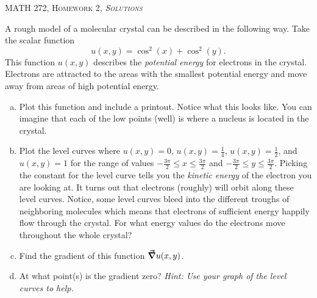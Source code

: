 \documentclass[12pt]{article} %
\begin{document}
\begin{center}
   \textsc{\large MATH 272, Homework 2, \emph{Solutions}}\\
\end{center}
\vspace{.5cm}

\begin{problem}
A rough model of a molecular crystal can be described in the following way. Take the scalar function
\[
u(x,y)=\cos^2(x)+\cos^2(y).
\]
This function $u(x,y)$ describes the \emph{potential energy} for electrons in the crystal. Electrons are attracted to the areas with the smallest potential energy and move away from areas of high potential energy. 
\begin{enumerate}[(a)]
    \item Plot this function and include a printout.  Notice what this looks like.  You can imagine that each of the low points (well) is where a nucleus is located in the crystal.
    \item Plot the level curves where $u(x,y)=0$, $u(x,y)=\frac{1}{4}$, $u(x,y)=\frac{1}{2}$, and $u(x,y)=1$ for the range of values $-\frac{3\pi}{2}\leq x \leq \frac{3\pi}{2}$ and $-\frac{3\pi}{2}\leq y \leq \frac{3\pi}{2}$. Picking the constant for the level curve tells you the \emph{kinetic energy} of the electron you are looking at.  It turns out that electrons (roughly) will orbit along these level curves.  Notice, some level curves bleed into the different troughs of neighboring molecules which means that electrons of sufficient energy happily flow through the crystal. For what energy values do the electrons move throughout the whole crystal?
    \item Find the gradient of this function $\boldsymbol{\vec{\nabla}} u(x,y)$.
    \item At what point(s) is the gradient zero? \emph{Hint: Use your graph of the level curves to help.}
    \end{enumerate}
\end{problem}
\end{document}
